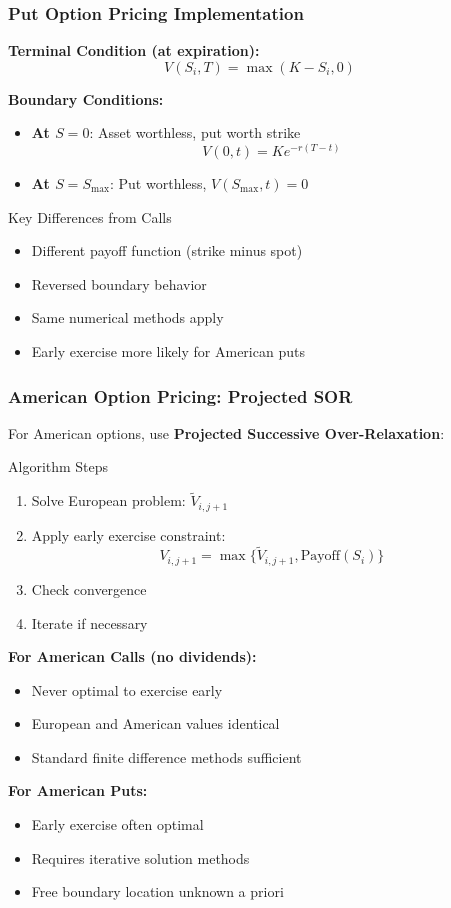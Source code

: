 \documentclass{beamer}
\begin{document}
\begin{frame}
\frametitle{Put Option Pricing Implementation}
\textbf{Terminal Condition (at expiration):}
\[V(S_i, T) = \max(K - S_i, 0)\]

\textbf{Boundary Conditions:}
\begin{itemize}
\item \textbf{At \(S = 0\)}: Asset worthless, put worth strike
\[V(0,t) = Ke^{-r(T-t)}\]
\item \textbf{At \(S = S_{\max}\)}: Put worthless, \(V(S_{\max},t) = 0\)
\end{itemize}

\begin{block}{Key Differences from Calls}
\begin{itemize}
\item Different payoff function (strike minus spot)
\item Reversed boundary behavior
\item Same numerical methods apply
\item Early exercise more likely for American puts
\end{itemize}
\end{block}
\end{frame}

\begin{frame}
\frametitle{American Option Pricing: Projected SOR}
For American options, use \textbf{Projected Successive Over-Relaxation}:

\begin{block}{Algorithm Steps}
\begin{enumerate}
\item Solve European problem: \(\tilde{V}_{i,j+1}\)
\item Apply early exercise constraint:
\[V_{i,j+1} = \max\{\tilde{V}_{i,j+1}, \text{Payoff}(S_i)\}\]
\item Check convergence
\item Iterate if necessary
\end{enumerate}
\end{block}

\textbf{For American Calls (no dividends):}
\begin{itemize}
\item Never optimal to exercise early
\item European and American values identical
\item Standard finite difference methods sufficient
\end{itemize}

\textbf{For American Puts:}
\begin{itemize}
\item Early exercise often optimal
\item Requires iterative solution methods
\item Free boundary location unknown a priori
\end{itemize}
\end{frame}
\end{document}
